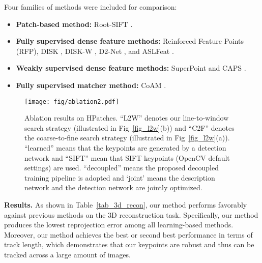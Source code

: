 \documentclass[10pt,twocolumn,letterpaper]{article}
\begin{document}
Four families of methods were included for comparison:
\begin{itemize}
    \item \textbf{ Patch-based method:} Root-SIFT \cite{arandjelovic2012three, lowe2004distinctive}.
    \vspace{-0.25cm}
    
    \item\textbf{ Fully supervised dense feature methods:}  Reinforced Feature Points \cite{bhowmik2020reinforced} (RFP), DISK \cite{tyszkiewiczDISKLearningLocal2020a}, DISK-W \cite{tyszkiewiczDISKLearningLocal2020a}, D2-Net \cite{Dusmanu2019CVPR}, and ASLFeat \cite{luo2020aslfeat}. \vspace{-0.25cm}

    \item\textbf{ Weakly supervised dense feature methods:}  SuperPoint \cite{detone2018superpoint} and CAPS \cite{wangLearningFeatureDescriptors2020}. 
    \vspace{-0.25cm}

    \item\textbf{ Fully supervised matcher method:} CoAM \cite{wiles2021coam}.
    
\end{itemize}
 
\begin{figure}[t]
    \centering
    \texttt{[image: fig/ablation2.pdf]}
    \caption{Ablation results on HPatches. ``L2W'' denotes our line-to-window search strategy (illustrated in Fig~\ref{fig_l2w}(b)) and ``C2F'' denotes the coarse-to-fine search strategy  \cite{wangLearningFeatureDescriptors2020} (illustrated in Fig~\ref{fig_l2w}(a)). ``learned'' means that the keypoints are generated by a detection network and ``SIFT'' mean that SIFT keypoints (OpenCV default settings) are used. ``decoupled'' means the proposed decoupled training pipeline is adopted and `joint' means the description network and the detection network are jointly optimized.}
    \label{fig_ablation_hpatch}
\end{figure}



\noindent\textbf{Results.} As shown in Table~\ref{tab_3d_recon}, our method performs favorably against previous methods on the 3D reconstruction task. Specifically, our method produces the lowest reprojection error among all learning-based methods.
Moreover, our method achieves the best or second best performance in terms of track length, which demonstrates that our keypoints are robust and thus can be tracked across a large amount of images. 
\end{document}
